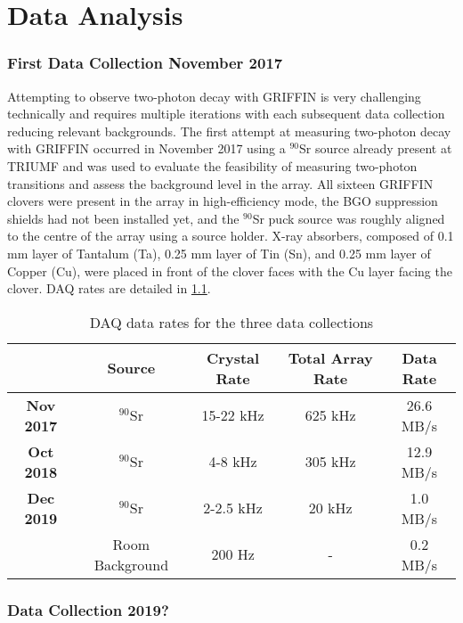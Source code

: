 \documentclass[cnatzke_thesis_proposal.tex]{subfiles}
\begin{document}
\chapter{Data Analysis}

\subsection{First Data Collection November 2017}
Attempting to observe two-photon decay with GRIFFIN is very challenging technically and requires multiple iterations with each subsequent data collection reducing relevant backgrounds. 
The first attempt at measuring two-photon decay with GRIFFIN occurred in November 2017 using a $^{90}$Sr source already present at TRIUMF and was used to evaluate the feasibility of measuring two-photon transitions and assess the background level in the array. 
All sixteen GRIFFIN clovers were present in the array in high-efficiency mode, the BGO suppression shields had not been installed yet, and the $^{90}$Sr puck source was roughly aligned to the centre of the array using a source holder. 
X-ray absorbers, composed of 0.1 mm layer of Tantalum (Ta), 0.25 mm layer of Tin (Sn), and 0.25 mm layer of Copper (Cu), were placed in front of the clover faces with the Cu layer facing the clover. 
DAQ rates are detailed in \ref{tab:daq_rates}.

\begin{table}[]
  \centering
  \begin{tabular}{ccccc}
                    & Source          & Crystal Rate & Total Array Rate & Data Rate \\ \hline
  \textbf{Nov 2017} & $^{90}$Sr       & 15-22 kHz    & 625 kHz          & 26.6 MB/s \\ \hline
  \textbf{Oct 2018} & $^{90}$Sr       & 4-8 kHz      & 305 kHz          & 12.9 MB/s \\ \hline
  \textbf{Dec 2019} & $^{90}$Sr       & 2-2.5 kHz    & 20 kHz           & 1.0 MB/s  \\ 
                    & Room Background & 200 Hz       & -                & 0.2 MB/s  \\ \hline
  \end{tabular}
  \caption{DAQ data rates for the three data collections}
  \label{tab:daq_rates}
\end{table}


\subsection{Data Collection 2019?}
\end{document}
